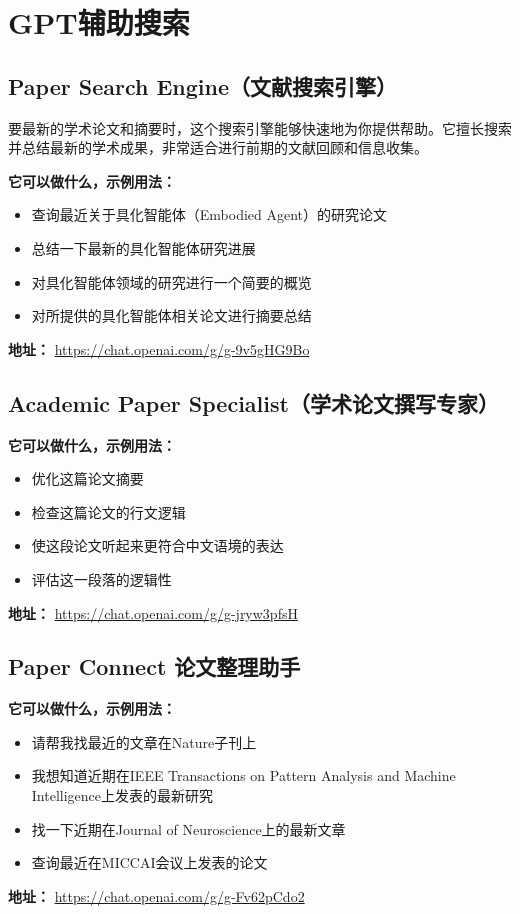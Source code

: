 \section{GPT辅助搜索}\label{sec:gpt-aided-writing}
\subsection{Paper Search Engine（文献搜索引擎）}

要最新的学术论文和摘要时，这个搜索引擎能够快速地为你提供帮助。它擅长搜索并总结最新的学术成果，非常适合进行前期的文献回顾和信息收集。

\textbf{它可以做什么，示例用法：}
\begin{itemize}
    \item 查询最近关于具化智能体（Embodied Agent）的研究论文
    \item 总结一下最新的具化智能体研究进展
    \item 对具化智能体领域的研究进行一个简要的概览
    \item 对所提供的具化智能体相关论文进行摘要总结
\end{itemize}
\textbf{地址：} \url{https://chat.openai.com/g/g-9v5gHG9Bo}

\subsection{Academic Paper Specialist（学术论文撰写专家）}
\textbf{它可以做什么，示例用法：}
\begin{itemize}
    \item 优化这篇论文摘要
    \item 检查这篇论文的行文逻辑
    \item 使这段论文听起来更符合中文语境的表达
    \item 评估这一段落的逻辑性
\end{itemize}
\textbf{地址：} \url{https://chat.openai.com/g/g-jryw3pfsH}

\subsection{Paper Connect 论文整理助手}
\textbf{它可以做什么，示例用法：}
\begin{itemize}
    \item 请帮我找最近的文章在Nature子刊上
    \item 我想知道近期在IEEE Transactions on Pattern Analysis and Machine Intelligence上发表的最新研究
    \item 找一下近期在Journal of Neuroscience上的最新文章
    \item 查询最近在MICCAI会议上发表的论文
\end{itemize}
\textbf{地址：} \url{https://chat.openai.com/g/g-Fv62pCdo2}


